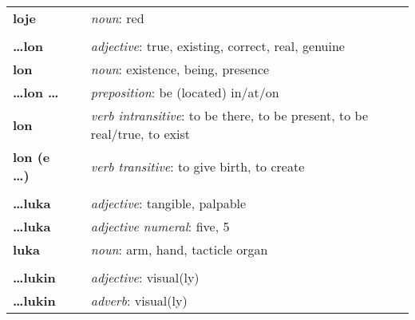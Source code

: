\begin{supertabular}{p{2,5cm}|ll}
    \textbf{loje}                &  & \textit{noun}: red                                                                                         \\
                                 &  &                                                                                                            \\
    \textbf{\dots lon}           &  & \textit{adjective}: true, existing, correct, real, genuine                                                 \\
    \textbf{lon}                 &  & \textit{noun}: existence, being, presence                                                                  \\
    \textbf{\dots lon \dots}     &  & \textit{preposition}: be (located) in/at/on                                                                \\
    \textbf{lon}                 &  & \textit{verb intransitive}: to be there, to be present, to be real/true, to exist                          \\
    \textbf{lon (e \dots)}       &  & \textit{verb transitive}: to give birth, to create                                                         \\
                                 &  &                                                                                                            \\
    \textbf{\dots luka}          &  & \textit{adjective}: tangible, palpable                                                                     \\
    \textbf{\dots luka}          &  & \textit{adjective numeral}: five, 5                                                                        \\
    \textbf{luka}                &  & \textit{noun}: arm, hand, tacticle organ                                                                   \\
                                 &  &                                                                                                            \\
    \textbf{\dots lukin}         &  & \textit{adjective}: visual(ly)                                                                             \\
    \textbf{\dots lukin}         &  & \textit{adverb}: visual(ly)                                                                                \\

\end{supertabular}
